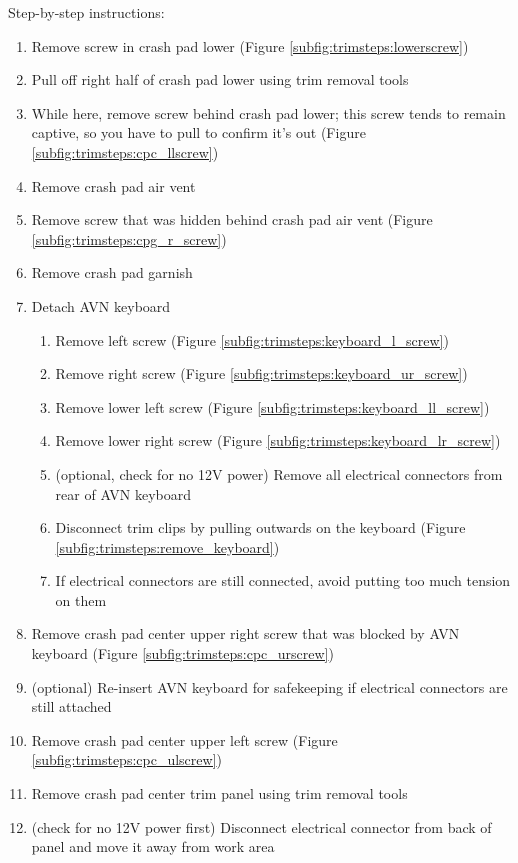 \documentclass[superscriptaddress,onecolumn,floatfix]{revtex4-2}
\begin{document}
Step-by-step instructions:
\begin{enumerate}
  \item Remove screw in crash pad lower (Figure \ref{subfig:trimsteps:lowerscrew})
  \item Pull off right half of crash pad lower using trim removal tools
  \item While here, remove screw behind crash pad lower; this screw tends to remain captive, so you have to pull to confirm it's out (Figure \ref{subfig:trimsteps:cpc_llscrew})
  \item Remove crash pad air vent
  \item Remove screw that was hidden behind crash pad air vent (Figure \ref{subfig:trimsteps:cpg_r_screw})
  \item Remove crash pad garnish
  \item Detach AVN keyboard 
    \begin{enumerate}
      \item Remove left screw (Figure \ref{subfig:trimsteps:keyboard_l_screw})
      \item Remove right screw (Figure \ref{subfig:trimsteps:keyboard_ur_screw})
      \item Remove lower left screw (Figure \ref{subfig:trimsteps:keyboard_ll_screw})
      \item Remove lower right screw (Figure \ref{subfig:trimsteps:keyboard_lr_screw})
      \item (optional, check for no 12V power) Remove all electrical connectors from rear of AVN keyboard
      \item Disconnect trim clips by pulling outwards on the keyboard (Figure \ref{subfig:trimsteps:remove_keyboard})
      \item If electrical connectors are still connected, avoid putting too much tension on them
    \end{enumerate}
  \item Remove crash pad center upper right screw that was blocked by AVN keyboard (Figure \ref{subfig:trimsteps:cpc_urscrew})
  \item (optional) Re-insert AVN keyboard for safekeeping if electrical connectors are still attached
  \item Remove crash pad center upper left screw (Figure \ref{subfig:trimsteps:cpc_ulscrew})
  \item Remove crash pad center trim panel using trim removal tools
  \item (check for no 12V power first) Disconnect electrical connector from back of panel and move it away from work area
\end{enumerate}
\end{document}
